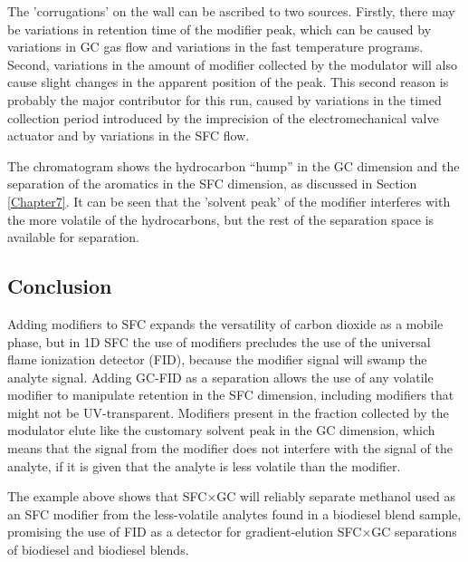 The 'corrugations' on the wall can be ascribed to two sources. Firstly, there
may be variations in retention time of the modifier peak, which can be caused by
variations in GC gas flow and variations in the fast temperature programs.
Second, variations in the amount of modifier collected by the modulator will
also cause slight changes in the apparent position of the peak. This second
reason is probably the major contributor for this run, caused by variations in
the timed collection period introduced by the imprecision of the
electromechanical valve actuator and by variations in the SFC flow.

The chromatogram shows the hydrocarbon ``hump'' in the GC dimension and the
separation of the aromatics in the SFC dimension, as discussed in Section
\ref{Chapter7}. It can be seen that the 'solvent peak' of the modifier
interferes with the more volatile of the hydrocarbons, but the rest of the
separation space is available for separation.

\subsection{Conclusion}

Adding modifiers to SFC expands the versatility of carbon dioxide as a mobile
phase, but in 1D SFC the use of modifiers precludes the use of the universal
flame ionization detector (FID), because the modifier signal will swamp the
analyte signal. Adding GC-FID as a \twoD separation allows the use of any
volatile modifier to manipulate retention in the SFC dimension, including
modifiers that might not be UV-transparent. Modifiers present in the fraction
collected by the modulator elute like the customary solvent peak in the GC
dimension, which means that the signal from the modifier does not interfere with
the signal of the analyte, if it is given that the analyte is less volatile than
the modifier.
 
The example above shows that SFC×GC will reliably separate methanol used as an
SFC modifier from the less-volatile analytes found in a biodiesel blend sample,
promising the use of FID as a detector for gradient-elution SFC×GC separations
of biodiesel and biodiesel blends.
